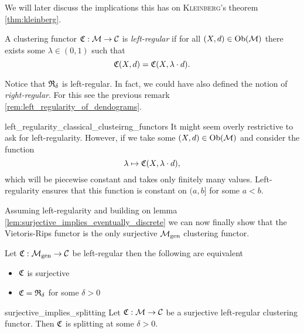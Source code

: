 We will later discuss the implications this has on \textsc{Kleinberg}'s theorem \ref{thm:kleinberg}. 

\begin{definition}{}{}
    A clustering functor $\mathfrak{C}: \mathcal{M} \to \mathcal{C}$ is \emph{left-regular} if for all $(X,d) \in \mathrm {Ob}(\mathcal{M})$ there exists some $\lambda \in (0, 1)$ such that
    $$
    \mathfrak{C}(X,d) = \mathfrak{C}(X, \lambda \cdot d).
    $$
    
\end{definition}

Notice that $\mathfrak{R}_\delta$ is left-regular. In fact, we could have also defined the notion of \emph{right-regular}. For this see the previous remark \ref{rem:left_regularity_of_dendograms}.\par

\begin{myremark}{}{left_regularity_classical_clusteirng_functors}
    \medskip It might seem overly restrictive to ask for left-regularity.
    However, if we take some $(X, d) \in \mathrm {Ob}(\mathcal{M})$ and consider the function 
    $$
    \lambda \mapsto \mathfrak{C}(X, \lambda \cdot d),
    $$
    which will be piecewise constant and takes only finitely many values.
    Left-regularity ensures that this function is constant on $(a, b]$ for some $a < b$.
\end{myremark}

Assuming left-regularity and building on lemma \ref{lem:surjective_implies_eventually_discrete} we can now finally show that the Vietoris-Rips functor is the only surjective ${\mathcal{M}_\mathrm{gen}}$ clustering functor.

\begin{theorem}{}{}
    Let $\mathfrak{C}: {\mathcal{M}_\mathrm{gen}} \to \mathcal{C}$ be left-regular then the following are equivalent

    \begin{itemize}
        \item $\mathfrak{C}$ is surjective
        \item $\mathfrak{C} = \mathfrak{R}_{\delta}$ for some $\delta > 0$
    \end{itemize}
\end{theorem}

\begin{lemma}{}{surjective_implies_splitting}
    Let $\mathfrak{C}: \mathcal{M} \to \mathcal{C}$ be a surjective left-regular clustering functor. Then $\mathfrak{C}$ is splitting at some $\delta > 0$.

\end{lemma}

